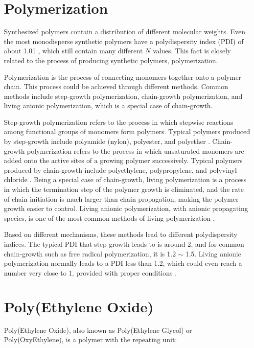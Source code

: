 \section{Polymerization}

Synthesized polymers contain a distribution of different molecular weights. Even the most monodisperse synthetic polymers have a polydispersity index (PDI) of about 1.01 \cite{Thakur2016}, which still contain many different $N$ values. This fact is closely related to the process of producing synthetic polymers, polymerization.

Polymerization is the process of connecting monomers together onto a polymer chain. This process could be achieved through different methods. Common methods include step-growth polymerization, chain-growth polymerization, and living anionic polymerization, which is a special case of chain-growth. 

Step-growth polymerization refers to the process in which stepwise reactions among functional groups of monomers form polymers. Typical polymers produced by step-growth include polyamide (nylon), polyester, and polyether \cite{Carraher2003a}. Chain-growth polymerization refers to the process in which unsaturated monomers are added onto the active sites of a growing polymer successively. Typical polymers produced by chain-growth include polyethylene, polypropylene, and polyvinyl chloride \cite{YOUNG2017}. Being a special case of chain-growth, living polymerization is a process in which the termination step of the polymer growth is eliminated, and the rate of chain initiation is much larger than chain propagation, making the polymer growth easier to control. Living anionic polymerization, with anionic propagating species, is one of the most common methods of living polymerization \cite{Halasa1981}. 

Based on different mechanisms, these methods lead to different polydispersity indices. The typical PDI that step-growth leads to is around 2, and for common chain-growth such as free radical polymerization, it is 1.2 $\sim$ 1.5. Living anionic polymerization normally leads to a PDI less than 1.2, which could even reach a number very close to 1, provided with proper conditions \cite{Dotson1995}.

\section{Poly(Ethylene Oxide)}

Poly(Ethylene Oxide), also known as Poly(Ethylene Glycol) or Poly(OxyEthylene), is a polymer with the repeating unit:

